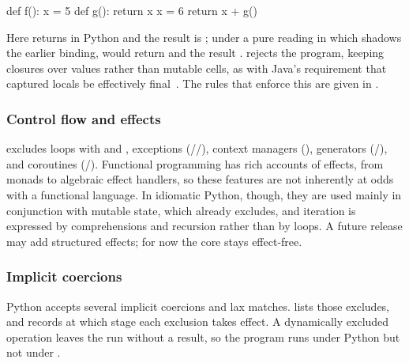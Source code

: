 \begin{python}
def f():
    x = 5
    def g():
        return x
    x = 6
    return x + g()
\end{python}

\noindent Here  returns  in Python and the result is ; under a pure
reading in which  shadows the earlier binding,  would return  and the
result . \PurePy rejects the program, keeping closures over values rather than mutable cells, as
with Java's requirement that captured locals be effectively final~\cite[\S15.27.2]{gosling2025}. The rules that
enforce this are given in .

\subsubsection{Control flow and effects}
\label{sec:no-effects}

\PurePy excludes loops with  and , exceptions
(/\allowbreak{}/\allowbreak{}), context managers (), generators
(/\allowbreak{}), and coroutines (/\allowbreak{}). Functional
programming has rich accounts of effects, from monads to algebraic effect handlers, so these features are not
inherently at odds with a functional language. In idiomatic Python, though, they are used mainly in
conjunction with mutable state, which \PurePy already excludes, and iteration is expressed by comprehensions
and recursion rather than by loops. A future release may add structured effects; for now the core stays
effect-free.

\subsubsection{Implicit coercions}
\label{sec:no-coercions}

Python accepts several implicit coercions and lax matches.  lists those \PurePy
excludes, and records at which stage each exclusion takes effect. A dynamically excluded operation leaves
the run without a result, so the program runs under Python but not under \PurePy.


